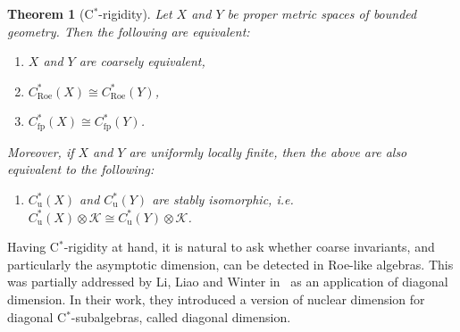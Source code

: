 \documentclass[a4paper]{amsart}
\newcommand{\myhyp}{\textnormal{-}\hskip0pt\relax}
\numberwithin{equation}{section}
\newcommand{\Kcal}{\mathcal{K}}
\newcommand{\cstarSub}{C$^\ast$\myhyp{}subalgebra}
\newcommand{\Croe}[1]{C^{\ast}_{\mathrm{Roe}}(#1)}
\newcommand{\Cu}[1]{C^{\ast}_{\mathrm{u}}({#1})}
\newcommand{\Cfp}[1]{C^{\ast}_{\mathrm{fp}}({#1})}
\theoremstyle{plain}
\theoremstyle{indented}
\numberwithin{equation}{section}
\theoremstyle{definition}
\theoremstyle{remark}
\theoremstyle{plain}
\newtheorem{alphthm}{Theorem}
\theoremstyle{definition}
\begin{document}
\begin{alphthm}[{C$^\ast$\myhyp{}rigidity}]
    Let $X$ and $Y$ be proper metric spaces of bounded geometry. 
    Then the following are equivalent:
    \begin{enumerate} \renewcommand{\labelenumi}{(\roman{enumi})}
        \item $X$ and $Y$ are coarsely equivalent,
        \item ${\Croe{X}\cong \Croe{Y}}$,
        \item ${\Cfp{X}\cong \Cfp{Y}}$.
    \end{enumerate}
    Moreover, if $X$ and $Y$ are uniformly locally finite, then the above are also equivalent to the following:
    \begin{enumerate}
        \item[(iv)] $\Cu{X}$ and $\Cu{Y}$ are stably isomorphic, i.e. ${\Cu{X}\otimes \Kcal \cong \Cu{Y} \otimes \Kcal}$.
    \end{enumerate}
\end{alphthm}




Having 
C$^\ast$\myhyp{}rigidity at hand, 
it is natural to ask whether coarse invariants, and particularly the asymptotic dimension, can be detected in Roe\myhyp{}like algebras. 
This was partially addressed by Li, Liao and Winter in~\cite{LiLiaoWinter2023diagDim} as an application of diagonal dimension. 
In their work, they introduced a version of nuclear dimension for diagonal \cstarSub{}s, 
called diagonal dimension.
\end{document}
